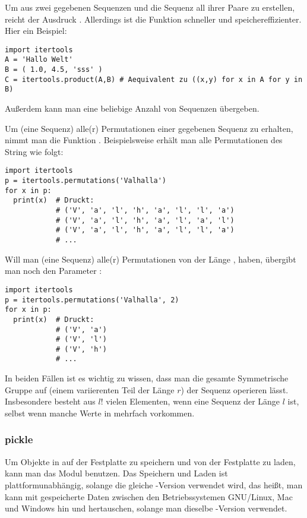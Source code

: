 Um aus zwei gegebenen Sequenzen  und  die Sequenz all ihrer Paare zu erstellen, reicht der Ausdruck .
Allerdings ist die Funktion  schneller und speichereffizienter.
Hier ein Beispiel:
\begin{lstlisting}
import itertools
A = 'Hallo Welt'
B = ( 1.0, 4.5, 'sss' )
C = itertools.product(A,B) # Aequivalent zu ((x,y) for x in A for y in B)
\end{lstlisting}
Außerdem kann man  eine beliebige Anzahl von Sequenzen übergeben.

Um (eine Sequenz) alle(r) Permutationen einer gegebenen Sequenz  zu erhalten, nimmt man die Funktion .
Beispielsweise erhält man alle Permutationen des String  wie folgt:
\begin{lstlisting}
import itertools
p = itertools.permutations('Valhalla')
for x in p:
  print(x)  # Druckt:
            # ('V', 'a', 'l', 'h', 'a', 'l', 'l', 'a')
            # ('V', 'a', 'l', 'h', 'a', 'l', 'a', 'l')
            # ('V', 'a', 'l', 'h', 'a', 'l', 'l', 'a')
            # ...
\end{lstlisting}
Will man (eine Sequenz) alle(r) Permutationen von  der Länge , haben, übergibt man  noch den Parameter :
\begin{lstlisting}
import itertools
p = itertools.permutations('Valhalla', 2)
for x in p:
  print(x)  # Druckt:
            # ('V', 'a')
            # ('V', 'l')
            # ('V', 'h')
            # ...
\end{lstlisting}
In beiden Fällen ist es wichtig zu wissen, dass man die gesamte Symmetrische Gruppe auf (einem variierenten Teil der Länge $r$) der Sequenz operieren lässt.
Insbesondere besteht  aus $l!$ vielen Elementen, wenn  eine Sequenz der Länge $l$ ist, selbst wenn manche Werte in  mehrfach vorkommen.


\subsubsection{pickle}
\label{section:module:empfohlene_module:pickle}
Um Objekte in \Python auf der Festplatte zu speichern und von der Festplatte zu laden, kann man das Modul  benutzen.
Das Speichern und Laden ist plattformunabhängig, solange die gleiche \Python-Version verwendet wird, das heißt,
man kann mit  gespeicherte Daten zwischen den Betriebssystemen GNU/Linux, Mac und Windows hin und hertauschen, solange man dieselbe \Python-Version verwendet.

